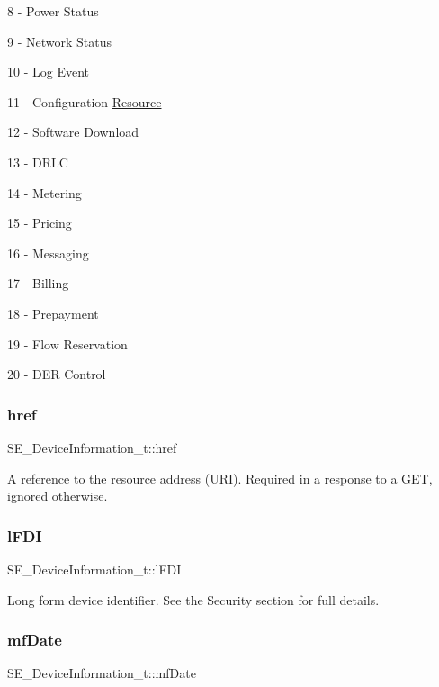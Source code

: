 8 -\/ Power Status

9 -\/ Network Status

10 -\/ Log Event

11 -\/ Configuration \hyperlink{structResource}{Resource}

12 -\/ Software Download

13 -\/ D\+R\+LC

14 -\/ Metering

15 -\/ Pricing

16 -\/ Messaging

17 -\/ Billing

18 -\/ Prepayment

19 -\/ Flow Reservation

20 -\/ D\+ER Control \mbox{\label{group__DeviceInformation_ga6a53de1479cd71c2f8125105ae4b0ac9}} 
\subsubsection{\texorpdfstring{href}{href}}
{\footnotesize\ttfamily S\+E\+\_\+\+Device\+Information\+\_\+t\+::href}

A reference to the resource address (U\+RI). Required in a response to a G\+ET, ignored otherwise. \mbox{\label{group__DeviceInformation_ga48d5783d339ebf6ed3d0d95efc1d949c}} 
\subsubsection{\texorpdfstring{l\+F\+DI}{lFDI}}
{\footnotesize\ttfamily S\+E\+\_\+\+Device\+Information\+\_\+t\+::l\+F\+DI}

Long form device identifier. See the Security section for full details. \mbox{\label{group__DeviceInformation_ga2e28d4743854f288b96a82c8245d91ca}} 
\subsubsection{\texorpdfstring{mf\+Date}{mfDate}}
{\footnotesize\ttfamily S\+E\+\_\+\+Device\+Information\+\_\+t\+::mf\+Date}

